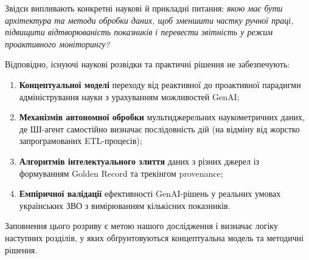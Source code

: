 Звідси випливають конкретні наукові й прикладні питання: \textit{якою має бути архітектура та методи обробки даних, щоб зменшити частку ручної праці, підвищити відтворюваність показників і перевести звітність у режим проактивного моніторингу?}

Відповідно, існуючі наукові розвідки та практичні рішення не забезпечують:
\begin{enumerate}[leftmargin=*,itemsep=0.2em]
\item \textbf{Концептуальної моделі} переходу від реактивної до проактивної парадигми адміністрування науки з урахуванням можливостей GenAI;
\item \textbf{Механізмів автономної обробки} мультиджерельних наукометричних даних, де ШІ-агент самостійно визначає послідовність дій (на відміну від жорстко запрограмованих ETL-процесів);
\item \textbf{Алгоритмів інтелектуального злиття} даних з різних джерел із формуванням Golden Record та трекінгом provenance;
\item \textbf{Емпіричної валідації} ефективності GenAI-рішень у реальних умовах українських ЗВО з вимірюванням кількісних показників.
\end{enumerate}

Заповнення цього розриву є метою нашого дослідження і визначає логіку наступних розділів, у яких обґрунтовуються концептуальна модель та методичні рішення.